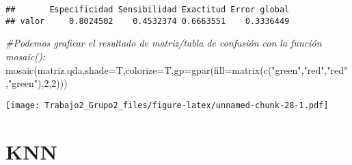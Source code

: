 \documentclass[
]{article}
\newenvironment{Shaded}{\begin{snugshade}}{\end{snugshade}}
\newcommand{\AttributeTok}[1]{\textcolor[rgb]{0.77,0.63,0.00}{#1}}
\newcommand{\CommentTok}[1]{\textcolor[rgb]{0.56,0.35,0.01}{\textit{#1}}}
\newcommand{\DecValTok}[1]{\textcolor[rgb]{0.00,0.00,0.81}{#1}}
\newcommand{\FunctionTok}[1]{\textcolor[rgb]{0.00,0.00,0.00}{#1}}
\newcommand{\NormalTok}[1]{#1}
\newcommand{\StringTok}[1]{\textcolor[rgb]{0.31,0.60,0.02}{#1}}
\begin{document}
\begin{verbatim}
##       Especificidad Sensibilidad Exactitud Error global
## valor     0.8024502    0.4532374 0.6663551    0.3336449
\end{verbatim}

\begin{Shaded}
\begin{Highlighting}[]
\CommentTok{\#Podemos graficar el resultado de matriz/tabla de confusión con la función \textasciigrave{}mosaic()\textasciigrave{}:}
\FunctionTok{mosaic}\NormalTok{(matriz.qda,}\AttributeTok{shade=}\NormalTok{T,}\AttributeTok{colorize=}\NormalTok{T,}\AttributeTok{gp=}\FunctionTok{gpar}\NormalTok{(}\AttributeTok{fill=}\FunctionTok{matrix}\NormalTok{(}\FunctionTok{c}\NormalTok{(}\StringTok{"green"}\NormalTok{,}\StringTok{"red"}\NormalTok{,}\StringTok{"red"}\NormalTok{,}\StringTok{"green"}\NormalTok{),}\DecValTok{2}\NormalTok{,}\DecValTok{2}\NormalTok{)))}
\end{Highlighting}
\end{Shaded}

\texttt{[image: Trabajo2\_Grupo2\_files/figure-latex/unnamed-chunk-28-1.pdf]}

\hypertarget{knn}{%
\section{KNN}\label{knn}}
\end{document}
